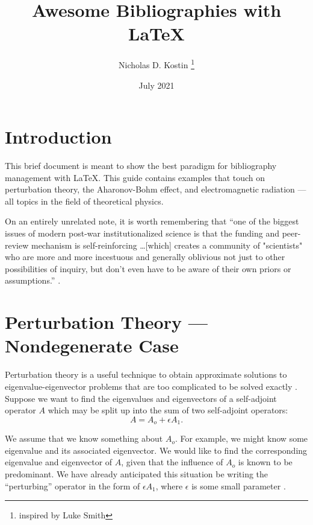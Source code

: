 \documentclass{article}
\title{Awesome Bibliographies with {\LaTeX}}
\author{Nicholas D. Kostin \thanks{inspired by Luke Smith}}
\date{July 2021}
\numberwithin{equation}{section}
\begin{document}
\begin{titlepage}
\maketitle
\end{titlepage}


\section{Introduction}

This brief document is meant to show the best paradigm for bibliography management with {\LaTeX}. This guide contains examples that touch on perturbation theory, the Aharonov-Bohm effect, and electromagnetic radiation --- all topics in the field of theoretical physics.

\vspace{1em}

On an entirely unrelated note, it is worth remembering that ``one of the biggest issues of modern post-war institutionalized science is that the funding and peer-review mechanism is self-reinforcing \ldots [which] creates a community of "scientists" who are more and more incestuous and generally oblivious not just to other possibilities of inquiry, but don't even have to be aware of their own priors or assumptions.'' \cite{fragile}. 

\section{Perturbation Theory --- Nondegenerate Case}

Perturbation theory is a useful technique to obtain approximate solutions to eigenvalue-eigenvector problems that are too complicated to be solved exactly \cite{byronfuller}. Suppose we want to find the eigenvalues and eigenvectors of a self-adjoint operator $A$ which may be split up into the sum of two self-adjoint operators:
\begin{equation*}
    A = A_o + \epsilon A_1.
\end{equation*}

We assume that we know something about $A_o$. For example, we might know some eigenvalue and its associated eigenvector. We would like to find the corresponding eigenvalue and eigenvector of $A$, given that the influence of $A_o$ is known to be predominant. We have already anticipated this situation be writing the ``perturbing'' operator in the form of $\epsilon A_1$, where $\epsilon$ is some small parameter \cite{byronfuller}.
\end{document}
